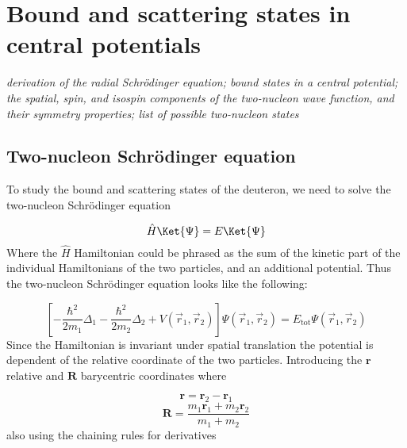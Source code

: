 \section{Bound and scattering states in central potentials}
\begin{center}
\textit{derivation of the radial Schrödinger equation; bound states in a central potential; the spatial, spin, and isospin components of the two-nucleon wave function, and their symmetry properties; list of possible two-nucleon states}
\end{center}

\subsection{Two-nucleon Schrödinger equation}
To study the bound and scattering states of the deuteron, we need to solve the two-nucleon Schrödinger equation

\begin{equation} \label{eq:2.1}
	\hat{H} \Ket{\Psi}
	=
	E \Ket{\Psi}
\end{equation}
Where the $\hat{H}$ Hamiltonian could be phrased as the sum of the kinetic part of the individual Hamiltonians of the two particles, and an additional potential. Thus the two-nucleon Schrödinger equation looks like the following:

\begin{equation} \label{eq:2.2}
	\left[
		- \frac{\hbar^{2}}{2 m_{1}} \Delta_{1}
		- \frac{\hbar^{2}}{2 m_{2}} \Delta_{2}
		+ V \left( \vec{r}_{1}, \vec{r}_{2} \right)
	\right]
	\Psi \left( \vec{r}_{1}, \vec{r}_{2} \right)
	=
	E_{\text{tot}} \Psi \left( \vec{r}_{1}, \vec{r}_{2} \right)
\end{equation}
Since the Hamiltonian is invariant under spatial translation the potential is dependent of the relative coordinate of the two particles. Introducing the $\boldsymbol{r}$ relative and $\boldsymbol{R}$ barycentric coordinates where

\begin{equation} \label{eq:2.3}
	\boldsymbol{r} = \boldsymbol{r}_{2} - \boldsymbol{r}_{1}
\end{equation}
\begin{equation} \label{eq:2.4}
	\boldsymbol{R} = \frac{m_{1} \boldsymbol{r}_{1} + m_{2} \boldsymbol{r}_{2}}{m_{1} + m_{2}}
\end{equation}
also using the chaining rules for derivatives

